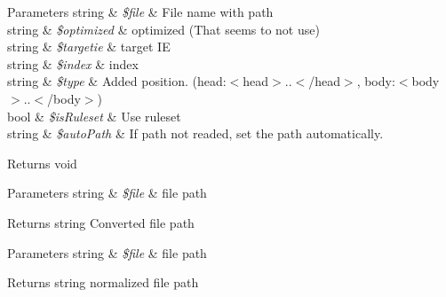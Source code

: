 \begin{DoxyRefList}
\item[\label{deprecated__deprecated000004}%
\hypertarget{deprecated__deprecated000004}{}%
Member \hyperlink{classContext_a69807c3ced3f97920b233a3fce3bb492}{Context\+:\+:add\+Js\+File} (\$file, \$optimized=F\+A\+L\+S\+E, \$targetie= \textquotesingle{}\textquotesingle{}, \$index=0, \$type= \textquotesingle{}head\textquotesingle{}, \$is\+Ruleset=F\+A\+L\+S\+E, \$auto\+Path=null)]
\begin{DoxyParams}[1]{Parameters}
string & {\em \$file} & File name with path \\
\hline
string & {\em \$optimized} & optimized (That seems to not use) \\
\hline
string & {\em \$targetie} & target I\+E \\
\hline
string & {\em \$index} & index \\
\hline
string & {\em \$type} & Added position. (head\+:$<$head$>$..$<$/head$>$, body\+:$<$body$>$..$<$/body$>$) \\
\hline
bool & {\em \$is\+Ruleset} & Use ruleset \\
\hline
string & {\em \$auto\+Path} & If path not readed, set the path automatically. \\
\hline
\end{DoxyParams}
\begin{DoxyReturn}{Returns}
void  
\end{DoxyReturn}

\item[\label{deprecated__deprecated000003}%
\hypertarget{deprecated__deprecated000003}{}%
Member \hyperlink{classContext_a217a7ff0e32178c6a2cc761de9c88998}{Context\+:\+:get\+Abs\+File\+Url} (\$file)]
\begin{DoxyParams}[1]{Parameters}
string & {\em \$file} & file path \\
\hline
\end{DoxyParams}
\begin{DoxyReturn}{Returns}
string Converted file path  
\end{DoxyReturn}

\item[\label{deprecated__deprecated000002}%
\hypertarget{deprecated__deprecated000002}{}%
Member \hyperlink{classContext_a47a8a7878385f0d5cb7085f933157128}{Context\+:\+:normalize\+File\+Path} (\$file)]
\begin{DoxyParams}[1]{Parameters}
string & {\em \$file} & file path \\
\hline
\end{DoxyParams}
\begin{DoxyReturn}{Returns}
string normalized file path  
\end{DoxyReturn}


\end{DoxyRefList}

